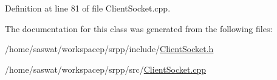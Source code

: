 Definition at line 81 of file ClientSocket.cpp.



The documentation for this class was generated from the following files:\begin{DoxyCompactItemize}
\item 
/home/saswat/workspacep/srpp/include/\hyperlink{_client_socket_8h}{ClientSocket.h}\item 
/home/saswat/workspacep/srpp/src/\hyperlink{_client_socket_8cpp}{ClientSocket.cpp}\end{DoxyCompactItemize}
